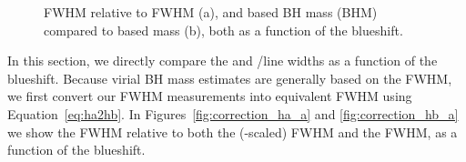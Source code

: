 \begin{figure}
    \captionsetup[subfigure]{labelformat=empty} 
    \centering
    \subfloat[\label{fig:correction_hb_a}]{}
    \subfloat[\label{fig:correction_hb_b}]{}
    \caption[{ FWHM relative to \hb FWHM and  based BH mass compared to \hb based mass, both as a function of the  blueshift.}]{ FWHM relative to \hb FWHM (a), and  based BH mass (BHM) compared to \hb based mass (b), both as a function of the  blueshift.}  
    \label{fig:correction_hb}
\end{figure}

In this section, we directly compare the  and \hans/\hb line widths as a function of the  blueshift. 
Because virial BH mass estimates are generally based on the \hb FWHM, we first convert our \ha FWHM measurements into equivalent \hb FWHM using Equation~\ref{eq:ha2hb}.  
In Figures~\ref{fig:correction_ha_a} and \ref{fig:correction_hb_a} we show the  FWHM relative to both the (\hbns-scaled) \ha FWHM and the \hb FWHM, as a function of the  blueshift. 

